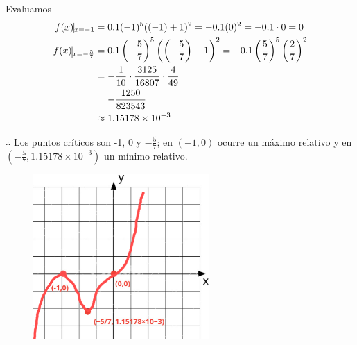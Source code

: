 \documentclass[12pt]{article}
\begin{document}
 Evaluamos
 \begin{align*}
   f(x)\vline_{x=-1}
   &=0.1(-1)^5 ((-1) + 1)^2
   =-0.1 (0)^2
   =-0.1\cdot 0
   = 0\\
   f(x)\vline_{x=-\frac{5}{7}}
   &=0.1\left(-\frac{5}{7}\right)^5 \left(\left(-\frac{5}{7}\right) + 1\right)^2
   =-0.1\left(\frac{5}{7}\right)^5 \left(\frac{2}{7}\right)^2\\
   &=-\frac{1}{10} \cdot \frac{3125}{16807} \cdot \frac{4}{49} \\
   &= -\frac{1250}{823543}\\
   & \approx 1.15178 \times 10^{-3}
 \end{align*}
 
 $\therefore $ Los puntos críticos son -1, 0 y $-\frac{5}{7}$; en $(-1,0)$ ocurre un máximo relativo y en $\left(-\frac{5}{7}, 1.15178 \times 10^{-3} \right)$ un mínimo relativo.
 \begin{figure}[H]
 \centering
 \includegraphics[width=0.6\textwidth]{../img/img_Lista3/2_70_last.png}
 \end{figure}
\end{document}
